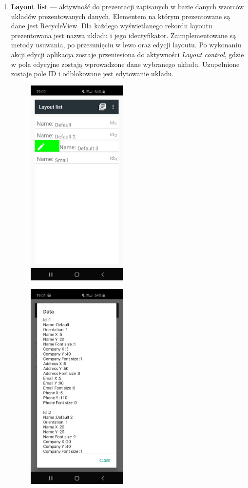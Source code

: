 \documentclass[a4paper,12pt, twoside]{article}
\begin{document}
\begin{enumerate}
           \item \textbf{Layout list} — aktywność do prezentacji zapisanych w bazie danych wzorców układów prezentowanych danych. Elementem na którym prezentowane są dane jest RecycleView. Dla każdego wyświetlanego rekordu layoutu prezentowana jest nazwa układu i jego identyfikator. Zaimplementowane są metody usuwania, po przesunięciu w lewo oraz edycji layoutu. Po wykonaniu akcji edycji aplikacja zostaje przeniesiona do aktywności \textit{Layout control}, gdzie w pola edycyjne zostają wprowadzone dane wybranego układu. Uzupełnione zostaje pole ID i odblokowane jest edytowanie układu. 
           \begin{figure}[H]
    	        \centering
    	        \begin{minipage}{.5\textwidth}
                    \centering
    	            \includegraphics[width=5cm]{images/view_layoutList.jpg}
                    \label{fig:layoutlist}
                \end{minipage}%
    	        \begin{minipage}{.5\textwidth}
    	            \centering
    	            \includegraphics[width=5cm]{images/view_layoutDetails.jpg}

\end{minipage}
\end{figure}
\end{enumerate}
\end{document}
